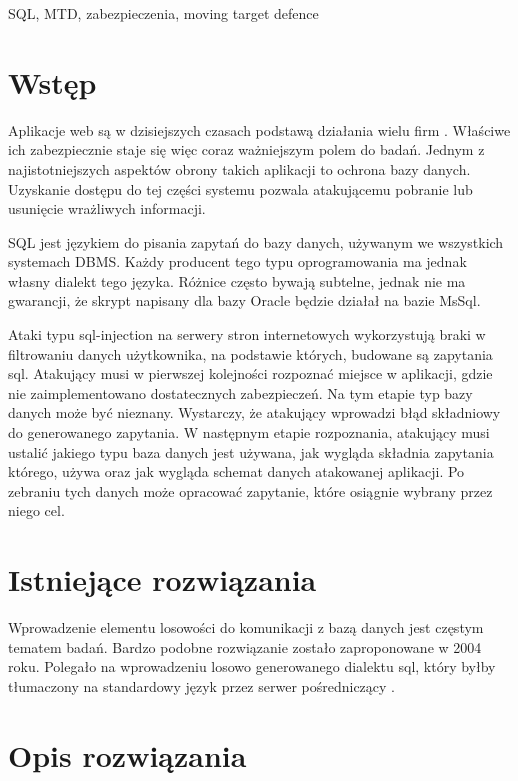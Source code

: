 \documentclass[conference]{IEEEtran}
\begin{document}
\begin{IEEEkeywords}
    SQL, MTD, zabezpieczenia, moving target defence
\end{IEEEkeywords}

\section{Wstęp}

Aplikacje web są w dzisiejszych czasach podstawą działania wielu firm \cite{web:apps}.
Właściwe ich zabezpiecznie staje się więc coraz ważniejszym polem do badań.
Jednym z najistotniejszych aspektów obrony takich aplikacji to ochrona bazy danych.
Uzyskanie dostępu do tej części systemu pozwala atakującemu pobranie lub usunięcie wrażliwych informacji.

SQL jest językiem do pisania zapytań do bazy danych, używanym we wszystkich systemach DBMS.
Każdy producent tego typu oprogramowania ma jednak własny dialekt tego języka.
Różnice często bywają subtelne, jednak nie ma gwarancji, że skrypt napisany dla bazy Oracle będzie działał na bazie MsSql.

Ataki typu sql-injection na serwery stron internetowych wykorzystują braki w filtrowaniu danych użytkownika, na podstawie których, budowane są zapytania sql.
Atakujący musi w pierwszej kolejności rozpoznać miejsce w aplikacji, gdzie nie zaimplementowano dostatecznych zabezpieczeń.
Na tym etapie typ bazy danych może być nieznany.
Wystarczy, że atakujący wprowadzi błąd składniowy do generowanego zapytania.
W następnym etapie rozpoznania, atakujący musi ustalić jakiego typu baza danych jest używana, jak wygląda składnia zapytania którego, używa oraz jak wygląda schemat danych atakowanej aplikacji.
Po zebraniu tych danych może opracować zapytanie, które osiągnie wybrany przez niego cel.

\section{Istniejące rozwiązania}

Wprowadzenie elementu losowości do komunikacji z bazą danych jest częstym tematem badań.
Bardzo podobne rozwiązanie zostało zaproponowane w 2004 roku.
Polegało na wprowadzeniu losowo generowanego dialektu sql, który byłby tłumaczony na standardowy język przez serwer pośredniczący \cite{sqlRand}.

\section{Opis rozwiązania}
\end{document}
